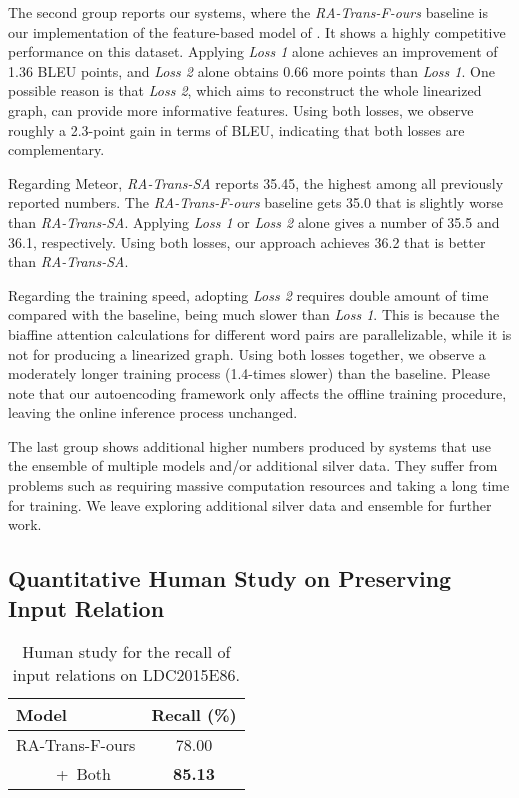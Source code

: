 \documentclass[11pt,a4paper]{article}
\begin{document}
The second group reports our systems, where the \emph{RA-Trans-F-ours} baseline is our implementation of the feature-based model of \citet{zhu2019modeling}.
It shows a highly competitive performance on this dataset.
Applying \emph{Loss 1} alone achieves an improvement of 1.36 BLEU points, and \emph{Loss 2} alone obtains 0.66 more points than \emph{Loss 1}.
One possible reason is that \emph{Loss 2}, which aims to reconstruct the whole linearized graph, can provide more informative features.
Using both losses, we observe roughly a 2.3-point gain in terms of BLEU, indicating that both losses are complementary.


Regarding Meteor, \emph{RA-Trans-SA} reports 35.45, the highest among all previously reported numbers.
The \emph{RA-Trans-F-ours} baseline gets 35.0 that is slightly worse than \emph{RA-Trans-SA}.
Applying \emph{Loss 1} or \emph{Loss 2} alone gives a number of 35.5 and 36.1, respectively.
Using both losses, our approach achieves 36.2 that is better than \emph{RA-Trans-SA}.


Regarding the training speed, adopting \emph{Loss 2} requires double amount of time compared with the baseline, being much slower than \emph{Loss 1}.
This is because the biaffine attention calculations for different word pairs are parallelizable, while it is not for producing a linearized graph.
Using both losses together, we observe a moderately longer training process (1.4-times slower) than the baseline.
Please note that our autoencoding framework only affects the offline training procedure, leaving the online inference process unchanged.


The last group shows additional higher numbers produced by systems that use the ensemble of multiple models and/or additional silver data.
They suffer from problems such as requiring massive computation resources and taking a long time for training.
We leave exploring additional silver data and ensemble for further work.


\subsection{Quantitative Human Study on Preserving Input Relation}


\begin{table}
    \centering
    \begin{tabular}{lc}
    \toprule
    Model & Recall (\%) \\
    \midrule
    RA-Trans-F-ours & 78.00 \\
    ~~~~~+~Both & \textbf{85.13} \\
    \bottomrule
    \end{tabular}
    \caption{Human study for the recall of input relations on LDC2015E86.}
    \label{tab:human_study}
    \vspace{-1.0em}
\end{table}
\end{document}
